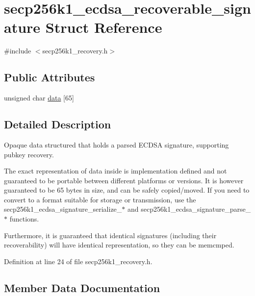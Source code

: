 \hypertarget{structsecp256k1__ecdsa__recoverable__signature}{}\section{secp256k1\+\_\+ecdsa\+\_\+recoverable\+\_\+signature Struct Reference}
\label{structsecp256k1__ecdsa__recoverable__signature}


{\ttfamily \#include $<$secp256k1\+\_\+recovery.\+h$>$}

\subsection*{Public Attributes}
\begin{DoxyCompactItemize}
\item 
unsigned char \hyperlink{structsecp256k1__ecdsa__recoverable__signature_a7157f0cd8b8fb97fceacfd9c0024a952}{data} \mbox{[}65\mbox{]}
\end{DoxyCompactItemize}


\subsection{Detailed Description}
Opaque data structured that holds a parsed E\+C\+D\+S\+A signature, supporting pubkey recovery.

The exact representation of data inside is implementation defined and not guaranteed to be portable between different platforms or versions. It is however guaranteed to be 65 bytes in size, and can be safely copied/moved. If you need to convert to a format suitable for storage or transmission, use the secp256k1\+\_\+ecdsa\+\_\+signature\+\_\+serialize\+\_\+$\ast$ and secp256k1\+\_\+ecdsa\+\_\+signature\+\_\+parse\+\_\+$\ast$ functions.

Furthermore, it is guaranteed that identical signatures (including their recoverability) will have identical representation, so they can be memcmp\textquotesingle{}ed. 

Definition at line 24 of file secp256k1\+\_\+recovery.\+h.



\subsection{Member Data Documentation}
\hypertarget{structsecp256k1__ecdsa__recoverable__signature_a7157f0cd8b8fb97fceacfd9c0024a952}{}
